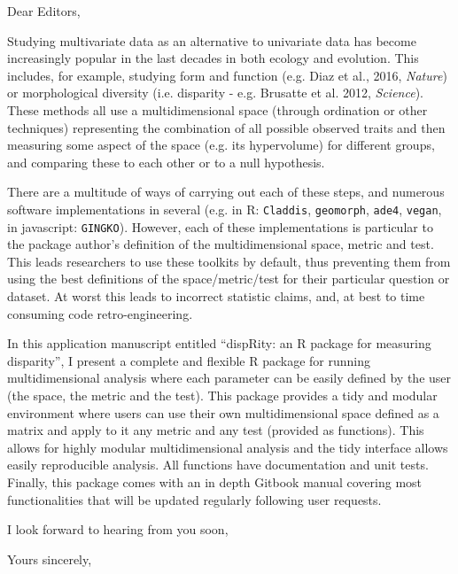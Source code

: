 \documentclass[11pt]{letter}
\begin{document}
\begin{letter}{}
\opening{Dear Editors,}

Studying multivariate data as an alternative to univariate data has become increasingly popular in the last decades in both ecology and evolution.
This includes, for example, studying form and function (e.g. Diaz et al., 2016, \textit{Nature}) or morphological diversity (i.e. disparity - e.g. Brusatte et al. 2012, \textit{Science}).
These methods all use a multidimensional space (through ordination or other techniques) representing the combination of all possible observed traits and then measuring some aspect of the space (e.g. its hypervolume) for different groups, and comparing these to each other or to a null hypothesis.

There are a multitude of ways of carrying out each of these steps, and numerous software implementations in several (e.g. in R: \texttt{Claddis}, \texttt{geomorph}, \texttt{ade4}, \texttt{vegan}, in javascript: \texttt{GINGKO}).
However, each of these implementations is particular to the package author's definition of the multidimensional space, metric and test.
This leads researchers to use these toolkits by default, thus preventing them from using the best definitions of the space/metric/test for their particular question or dataset.
At worst this leads to incorrect statistic claims, and, at best to time consuming code retro-engineering.

In this application manuscript entitled ``dispRity: an R package for measuring disparity'', I present a complete and flexible R package for running multidimensional analysis where each parameter can be easily defined by the user (the space, the metric and the test).
This package provides a tidy and modular environment where users can use their own multidimensional space defined as a matrix and apply to it any metric and any test (provided as functions).
This allows for highly modular multidimensional analysis and the tidy interface allows easily reproducible analysis.
All functions have documentation and unit tests. 
Finally, this package comes with an in depth Gitbook manual covering most functionalities that will be updated regularly following user requests. 


I look forward to hearing from you soon,

\closing{Yours sincerely,}

\end{letter}
\end{document}
